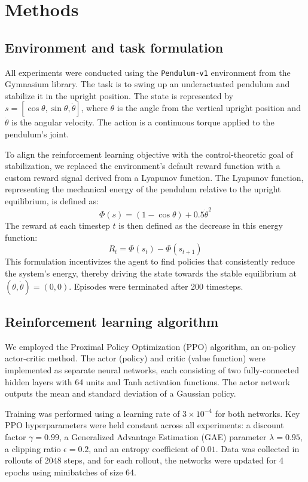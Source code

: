 \documentclass[]{article}
\begin{document}
\section{Methods}
\label{sec:methods}
\subsection{Environment and task formulation}
All experiments were conducted using the \texttt{Pendulum-v1} environment from the Gymnasium library. The task is to swing up an underactuated pendulum and stabilize it in the upright position. The state is represented by $s = [\cos\theta, \sin\theta, \dot\theta]$, where $\theta$ is the angle from the vertical upright position and $\dot\theta$ is the angular velocity. The action is a continuous torque applied to the pendulum's joint.

To align the reinforcement learning objective with the control-theoretic goal of stabilization, we replaced the environment's default reward function with a custom reward signal derived from a Lyapunov function. The Lyapunov function, representing the mechanical energy of the pendulum relative to the upright equilibrium, is defined as:
\begin{equation}
\Phi(s) = (1 - \cos\theta) + 0.5\dot\theta^2
\end{equation}
The reward at each timestep $t$ is then defined as the decrease in this energy function:
\begin{equation}
R_t = \Phi(s_t) - \Phi(s_{t+1})
\end{equation}
This formulation incentivizes the agent to find policies that consistently reduce the system's energy, thereby driving the state towards the stable equilibrium at $(\theta, \dot\theta) = (0, 0)$. Episodes were terminated after 200 timesteps.

\subsection{Reinforcement learning algorithm}
We employed the Proximal Policy Optimization (PPO) algorithm, an on-policy actor-critic method. The actor (policy) and critic (value function) were implemented as separate neural networks, each consisting of two fully-connected hidden layers with 64 units and Tanh activation functions. The actor network outputs the mean and standard deviation of a Gaussian policy.

Training was performed using a learning rate of $3 \times 10^{-4}$ for both networks. Key PPO hyperparameters were held constant across all experiments: a discount factor $\gamma = 0.99$, a Generalized Advantage Estimation (GAE) parameter $\lambda = 0.95$, a clipping ratio $\epsilon = 0.2$, and an entropy coefficient of $0.01$. Data was collected in rollouts of 2048 steps, and for each rollout, the networks were updated for 4 epochs using minibatches of size 64.
\end{document}
